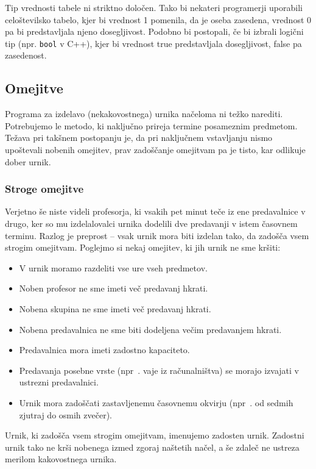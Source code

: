 \documentclass[a4paper, 10pt]{article}
\begin{document}
Tip vrednosti tabele ni striktno določen. Tako bi nekateri programerji uporabili
celoštevilsko tabelo, kjer bi vrednost 1 pomenila, da je oseba zasedena, vrednost 0
pa bi predstavljala njeno dosegljivost. Podobno bi postopali, če bi izbrali logični
tip (npr. \verb|bool| v C++), kjer bi vrednost true predstavljala
dosegljivost, false pa zasedenost.

\subsection{Omejitve }%

Programa za izdelavo (nekakovostnega) urnika načeloma ni težko narediti. Potrebujemo
le metodo, ki naključno prireja termine posameznim predmetom. Težava pri takšnem postopanju
je, da pri naključnem vstavljanju nismo upoštevali nobenih omejitev, prav zadoščanje omejitvam
pa je tisto, kar odlikuje dober urnik.

\subsubsection{Stroge omejitve }%

Verjetno še niste videli profesorja, ki vsakih pet minut teče iz ene predavalnice v drugo,
ker so mu izdelalovalci urnika dodelili dve predavanji v istem časovnem terminu. Razlog
je preprost -- vsak urnik mora biti izdelan tako, da zadošča vsem strogim omejitvam.
Poglejmo si nekaj omejitev, ki jih urnik ne sme kršiti:

   \begin{itemize}
	\item V urnik moramo razdeliti vse ure vseh predmetov.
   \item Noben profesor ne sme imeti več predavanj hkrati.
   \item Nobena skupina ne sme imeti več predavanj hkrati.
   \item Nobena predavalnica ne sme biti dodeljena večim predavanjem hkrati.
   \item Predavalnica mora imeti zadostno kapaciteto.
   \item Predavanja posebne vrste (npr~. vaje iz računalništva) se morajo izvajati v ustrezni predavalnici.
   \item Urnik mora zadoščati zastavljenemu časovnemu okvirju (npr~. od sedmih zjutraj do osmih zvečer).
\end{itemize}
%
Urnik, ki zadošča vsem strogim omejitvam, imenujemo zadosten urnik. Zadostni urnik tako ne
krši nobenega izmed zgoraj naštetih načel, a še zdaleč ne ustreza merilom kakovostnega urnika.
\end{document}
